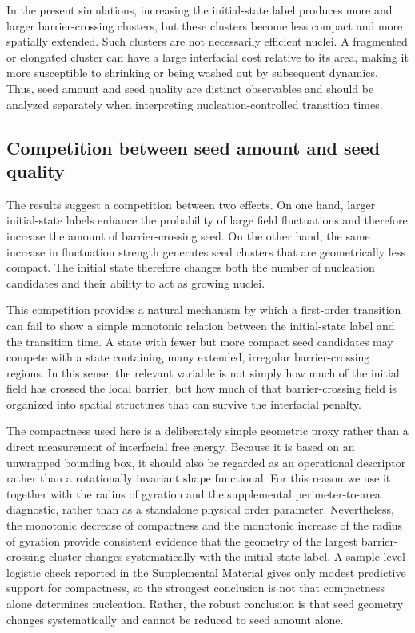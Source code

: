 ﻿\documentclass[aps,pre,preprint,showkeys,amsmath,amssymb,superscriptaddress,longbibliography]{revtex4-2}
\begin{document}
In the present simulations, increasing the initial-state label produces more and larger barrier-crossing clusters, but these clusters become less compact and more spatially extended. Such clusters are not necessarily efficient nuclei. A fragmented or elongated cluster can have a large interfacial cost relative to its area, making it more susceptible to shrinking or being washed out by subsequent dynamics. Thus, seed amount and seed quality are distinct observables and should be analyzed separately when interpreting nucleation-controlled transition times.

\subsection{Competition between seed amount and seed quality}\label{competition-between-seed-amount-and-seed-quality}

The results suggest a competition between two effects. On one hand, larger initial-state labels enhance the probability of large field fluctuations and therefore increase the amount of barrier-crossing seed. On the other hand, the same increase in fluctuation strength generates seed clusters that are geometrically less compact. The initial state therefore changes both the number of nucleation candidates and their ability to act as growing nuclei.

This competition provides a natural mechanism by which a first-order transition can fail to show a simple monotonic relation between the initial-state label and the transition time. A state with fewer but more compact seed candidates may compete with a state containing many extended, irregular barrier-crossing regions. In this sense, the relevant variable is not simply how much of the initial field has crossed the local barrier, but how much of that barrier-crossing field is organized into spatial structures that can survive the interfacial penalty.

The compactness used here is a deliberately simple geometric proxy rather than a direct measurement of interfacial free energy. Because it is based on an unwrapped bounding box, it should also be regarded as an operational descriptor rather than a rotationally invariant shape functional. For this reason we use it together with the radius of gyration and the supplemental perimeter-to-area diagnostic, rather than as a standalone physical order parameter. Nevertheless, the monotonic decrease of compactness and the monotonic increase of the radius of gyration provide consistent evidence that the geometry of the largest barrier-crossing cluster changes systematically with the initial-state label. A sample-level logistic check reported in the Supplemental Material gives only modest predictive support for compactness, so the strongest conclusion is not that compactness alone determines nucleation. Rather, the robust conclusion is that seed geometry changes systematically and cannot be reduced to seed amount alone.
\end{document}
